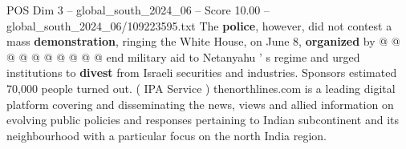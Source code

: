 \begin{textsample}{POS Dim 3 – global\_south\_2024\_06 – Score 10.00 – global\_south\_2024\_06/109223595.txt}
The \textbf{police}, however, did not contest a mass \textbf{demonstration}, ringing the White House, on June 8, \textbf{organized} by @ @ @ @ @ @ @ @ @ @ end military aid to Netanyahu ' s regime and urged institutions to \textbf{divest} from Israeli securities and industries.
Sponsors estimated 70,000 people turned out. ( IPA Service ) thenorthlines.com is a leading digital platform covering and disseminating the news, views and allied information on evolving public policies and responses pertaining to Indian subcontinent and its neighbourhood with a particular focus on the north India region.

\end{textsample}
